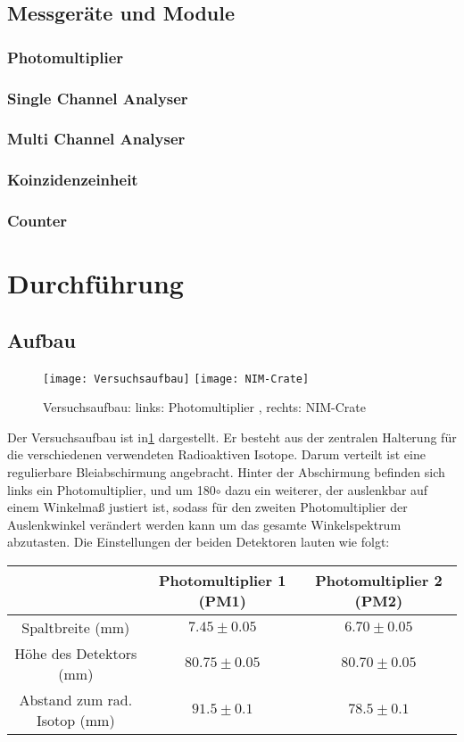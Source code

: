 \documentclass{../Misc/MontavonLaTeX/Montavon}
\newcommand{\halfwidth}{0.48\textwidth}
\begin{document}
\subsection{Messgeräte und Module}
\subsubsection{Photomultiplier}
\subsubsection{Single Channel Analyser}
\subsubsection{Multi Channel Analyser}
\subsubsection{Koinzidenzeinheit}
\subsubsection{Counter}


\section{Durchführung}

\subsection{Aufbau}

\begin{figure}[htbp]
\centering
\texttt{[image: Versuchsaufbau]}
\texttt{[image: NIM-Crate]}
\caption{Versuchsaufbau: links: Photomultiplier , rechts: NIM-Crate}
\label{fig:Aufbau}
\end{figure}

Der Versuchsaufbau ist in\ref{fig:Aufbau} dargestellt. Er besteht aus der zentralen Halterung für die verschiedenen verwendeten Radioaktiven Isotope. Darum verteilt ist eine regulierbare Bleiabschirmung angebracht. Hinter der Abschirmung befinden sich links ein Photomultiplier, und um 180$\circ$ dazu ein weiterer, der auslenkbar auf einem Winkelmaß justiert ist, sodass für den zweiten Photomultiplier der Auslenkwinkel verändert werden kann um das gesamte Winkelspektrum abzutasten. Die Einstellungen der beiden Detektoren lauten wie folgt:

\begin{tabular}{|c|c|c|}
\hline 
 & Photomultiplier 1 (PM1)  & Photomultiplier 2 (PM2)\tabularnewline
\hline 
Spaltbreite (mm) & $7.45\pm0.05$ & $6.70\pm0.05$\tabularnewline
\hline 
Höhe des Detektors (mm) & $80.75\pm0.05$ & $80.70\pm0.05$\tabularnewline
\hline 
Abstand zum rad. Isotop (mm) & $91.5\pm0.1$ & $78.5\pm0.1$\tabularnewline
\hline 
\end{tabular}
\end{document}
